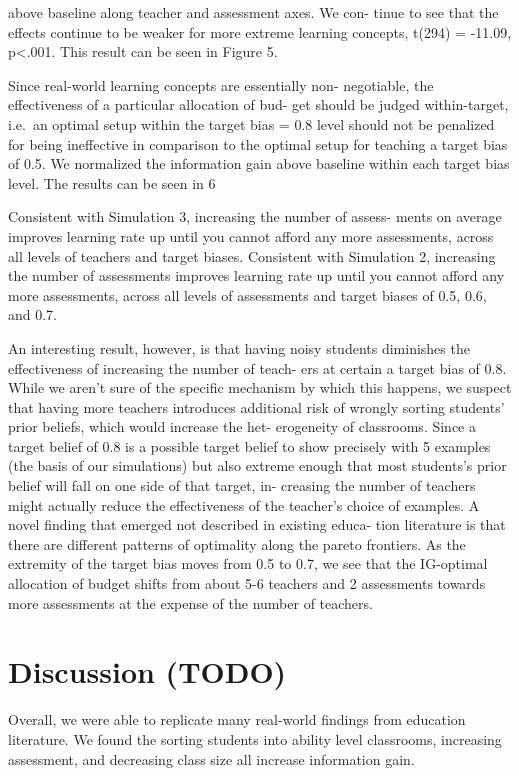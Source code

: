 \documentclass[10pt, letterpaper]{article}
\begin{document}
above baseline along teacher and assessment axes. We con- tinue to see
that the effects continue to be weaker for more extreme learning
concepts, t(294) = -11.09, p\textless{}.001. This result can be seen in
Figure 5.

Since real-world learning concepts are essentially non- negotiable, the
effectiveness of a particular allocation of bud- get should be judged
within-target, i.e.~an optimal setup within the target bias = 0.8 level
should not be penalized for being ineffective in comparison to the
optimal setup for teaching a target bias of 0.5. We normalized the
information gain above baseline within each target bias level. The
results can be seen in 6

Consistent with Simulation 3, increasing the number of assess- ments on
average improves learning rate up until you cannot afford any more
assessments, across all levels of teachers and target biases. Consistent
with Simulation 2, increasing the number of assessments improves
learning rate up until you cannot afford any more assessments, across
all levels of assessments and target biases of 0.5, 0.6, and 0.7.

An interesting result, however, is that having noisy students diminishes
the effectiveness of increasing the number of teach- ers at certain a
target bias of 0.8. While we aren't sure of the specific mechanism by
which this happens, we suspect that having more teachers introduces
additional risk of wrongly sorting students' prior beliefs, which would
increase the het- erogeneity of classrooms. Since a target belief of 0.8
is a possible target belief to show precisely with 5 examples (the basis
of our simulations) but also extreme enough that most students's prior
belief will fall on one side of that target, in- creasing the number of
teachers might actually reduce the effectiveness of the teacher's choice
of examples. A novel finding that emerged not described in existing
educa- tion literature is that there are different patterns of
optimality along the pareto frontiers. As the extremity of the target
bias moves from 0.5 to 0.7, we see that the IG-optimal allocation of
budget shifts from about 5-6 teachers and 2 assessments towards more
assessments at the expense of the number of teachers.

\section{Discussion (TODO)}\label{discussion-todo}

Overall, we were able to replicate many real-world findings from
education literature. We found the sorting students into ability level
classrooms, increasing assessment, and decreasing class size all
increase information gain.
\end{document}
